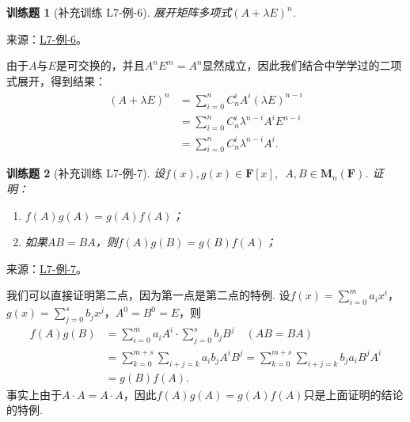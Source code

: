 \documentclass[12pt,fontset=fandol]{ctexart}
\newtheorem{exercise}{训练题}[section]
\begin{document}
\begin{exercise}[补充训练 L7-例-6]\label{prob:L7-例-6}
展开矩阵多项式$(A+\lambda E)^n$.
\end{exercise}
\noindent 来源：\href{https://github.com/yhwu-is/Linear-Algebra-Left-Undone/blob/new/%E8%AE%B2%E4%B9%89/%E4%B8%93%E9%A2%98/7%20%E7%BA%BF%E6%80%A7%E6%98%A0%E5%B0%84%E7%9F%A9%E9%98%B5%E8%A1%A8%E7%A4%BA%E4%B8%8E%E7%9F%A9%E9%98%B5%E8%BF%90%E7%AE%97%E5%9F%BA%E7%A1%80.tex}{L7-例-6}。
\begin{solve}
由于$A$与$E$是可交换的，并且$A^nE^m=A^n$显然成立，因此我们结合中学学过的二项式展开，得到结果：
    \begin{align*}
        (A+\lambda E)^n & =\sum_{i=0}^nC_n^iA^i(\lambda E)^{n-i}    \\
                        & =\sum_{i=0}^nC_n^i\lambda^{n-i}A^iE^{n-i} \\
                        & =\sum_{i=0}^nC_n^i\lambda^{n-i}A^i.
    \end{align*}
\end{solve}

\begin{exercise}[补充训练 L7-例-7]\label{prob:L7-例-7}
设$f(x),g(x) \in \mathbf{F}[x],\enspace A,B \in \mathbf{M}_n(\mathbf{F})$. 证明：
    \begin{enumerate}
        \item $f(A)g(A)=g(A)f(A)$；

        \item 如果$AB=BA$，则$f(A)g(B)=g(B)f(A)$；
    \end{enumerate}
\end{exercise}
\noindent 来源：\href{https://github.com/yhwu-is/Linear-Algebra-Left-Undone/blob/new/%E8%AE%B2%E4%B9%89/%E4%B8%93%E9%A2%98/7%20%E7%BA%BF%E6%80%A7%E6%98%A0%E5%B0%84%E7%9F%A9%E9%98%B5%E8%A1%A8%E7%A4%BA%E4%B8%8E%E7%9F%A9%E9%98%B5%E8%BF%90%E7%AE%97%E5%9F%BA%E7%A1%80.tex}{L7-例-7}。
\begin{solve}
我们可以直接证明第二点，因为第一点是第二点的特例. 设$f(x)=\displaystyle\sum_{i=0}^ma_ix^i$，$g(x)=\displaystyle\sum_{j=0}^sb_jx^j$，$A^0=B^0=E$，则
    \begin{align*}
        f(A)g(B) & =\sum_{i=0}^ma_iA^i\cdot \sum_{j=0}^sb_jB^j\quad(AB=BA)                            \\
                 & =\sum_{k=0}^{m+s}\sum_{i+j=k}a_ib_jA^iB^j=\sum_{k=0}^{m+s}\sum_{i+j=k}b_ja_iB^jA^i \\
                 & =g(B)f(A).
    \end{align*}
    事实上由于$A\cdot A=A\cdot A$，因此$f(A)g(A)=g(A)f(A)$只是上面证明的结论的特例.
\end{solve}
\end{document}
